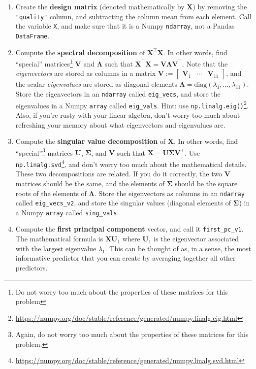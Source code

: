 \documentclass[
  12pt,
  krantz2]{krantz}
\renewcommand{\href}[2]{#2\footnote{\url{#1}}}
\begin{document}
\begin{enumerate}
\def\labelenumi{\alph{enumi}.}
\item
  Create the \textbf{design matrix} (denoted mathematically by \(\mathbf{X}\)) by removing the \texttt{"quality"} column, and subtracting the column mean from each element. Call the variable \texttt{X}, and make sure that it is a Numpy \texttt{ndarray}, not a Pandas \texttt{DataFrame}.
\item
  Compute the \textbf{spectral decomposition} of \(\mathbf{X}^\intercal \mathbf{X}\). In other words, find ``special'' matrices\footnote{Do not worry too much about the properties of these matrices for this problem} \(\mathbf{V}\) and \(\boldsymbol{\Lambda}\) such that \(\mathbf{X}^\intercal \mathbf{X} = \mathbf{V} \boldsymbol{\Lambda} \mathbf{V}^\intercal\). Note that the \emph{eigenvectors} are stored as columns in a matrix \(\mathbf{V} := \begin{bmatrix} \mathbf{V}_1 & \cdots & \mathbf{V}_{11}\end{bmatrix}\), and the scalar \emph{eigenvalues} are stored as diagonal elements \(\boldsymbol{\Lambda} = \text{diag}(\lambda_1, \ldots, \lambda_{11})\). Store the eigenvectors in an \texttt{ndarray} called \texttt{eig\_vecs}, and store the eigenvalues in a Numpy \texttt{array} called \texttt{eig\_vals}. Hint: use \href{https://numpy.org/doc/stable/reference/generated/numpy.linalg.eig.html}{\texttt{np.linalg.eig()}}. Also, if you're rusty with your linear algebra, don't worry too much about refreshing your memory about what eigenvectors and eigenvalues are.
\item
  Compute the \textbf{singular value decomposition} of \(\mathbf{X}\). In other words, find ``special''\footnote{Again, do not worry too much about the properties of these matrices for this problem.} matrices \(\mathbf{U}\), \(\mathbf{\Sigma}\), and \(\mathbf{V}\) such that \(\mathbf{X} = \mathbf{U} \mathbf{\Sigma} \mathbf{V}^\intercal\). Use \href{https://numpy.org/doc/stable/reference/generated/numpy.linalg.svd.html}{\texttt{np.linalg.svd}}, and don't worry too much about the mathematical details. These two decompositions are related. If you do it correctly, the two \(\mathbf{V}\) matrices should be the same, and the elements of \(\boldsymbol{\Sigma}\) should be the square roots of the elements of \(\boldsymbol{\Lambda}\). Store the eigenvectors as columns in an \texttt{ndarray} called \texttt{eig\_vecs\_v2}, and store the singular values (diagonal elements of \(\boldsymbol{\Sigma}\)) in a Numpy \texttt{array} called \texttt{sing\_vals}.
\item
  Compute the \textbf{first principal component} vector, and call it \texttt{first\_pc\_v1}. The mathematical formula is \(\mathbf{X} \mathbf{U}_1\) where \(\mathbf{U}_1\) is the eigenvector associated with the largest eigenvalue \(\lambda_1\). This can be thought of as, in a sense, the most informative predictor that you can create by averaging together all other predictors.
\end{enumerate}
\end{document}
